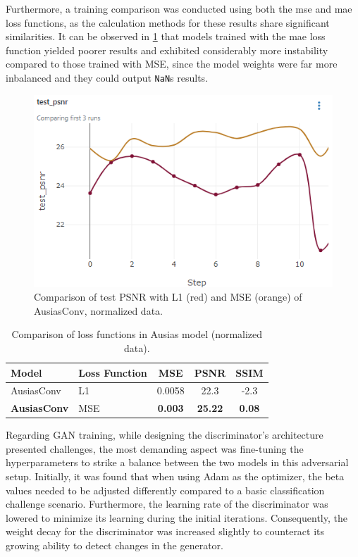 Furthermore, a training comparison was conducted using both the \gls{mse} and \gls{mae} loss functions, as the calculation methods for these results share significant similarities. It can be observed in \ref{tab:models-l1} that models trained with the \gls{mae} loss function yielded poorer results and exhibited considerably more instability compared to those trained with MSE, since the model weights were far more inbalanced and they could output \texttt{NaN}s results.
\begin{figure}[H]
\centering
\includegraphics[width=12cm]{imgs/models/ausiasconvl1.png}
\caption{Comparison of test PSNR with L1 (red) and MSE (orange) of AusiasConv, normalized data.}
\label{fig:models-carla-loss}
\end{figure}
\begin{table}[H]
	\caption{Comparison of loss functions in Ausias model (normalized data).}
	\centering
	\begin{tabular}{ll|ccc}
		Model               & Loss Function &       MSE        &      PSNR       &      SSIM      \\ \hline
		AusiasConv          & L1            &     0.0058      & 22.3 &     -2.3      \\ %
		\textbf{AusiasConv} & MSE           & \textbf{0.003} & \textbf{25.22} & \textbf{ 0.08}
	\end{tabular}
	\label{tab:models-l1}
\end{table}
Regarding GAN training, while designing the discriminator's architecture presented challenges, the most demanding aspect was fine-tuning the hyperparameters to strike a balance between the two models in this adversarial setup. Initially, it was found that when using Adam as the optimizer, the beta values needed to be adjusted differently compared to a basic classification challenge scenario. Furthermore, the learning rate of the discriminator was lowered to minimize its learning during the initial iterations. Consequently, the weight decay for the discriminator was increased slightly to counteract its growing ability to detect changes in the generator.

